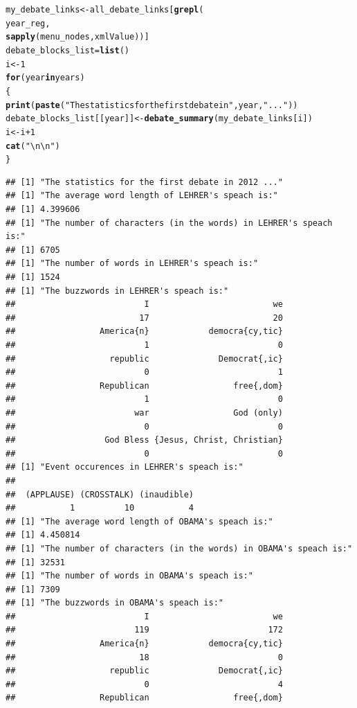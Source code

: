\documentclass{article}\usepackage[]{graphicx}\usepackage[]{color}
\makeatletter
\newcommand{\hlnum}[1]{\textcolor[rgb]{0.686,0.059,0.569}{#1}}%
\newcommand{\hlstr}[1]{\textcolor[rgb]{0.192,0.494,0.8}{#1}}%
\newcommand{\hlopt}[1]{\textcolor[rgb]{0,0,0}{#1}}%
\newcommand{\hlstd}[1]{\textcolor[rgb]{0.345,0.345,0.345}{#1}}%
\newcommand{\hlkwa}[1]{\textcolor[rgb]{0.161,0.373,0.58}{\textbf{#1}}}%
\newcommand{\hlkwb}[1]{\textcolor[rgb]{0.69,0.353,0.396}{#1}}%
\newcommand{\hlkwd}[1]{\textcolor[rgb]{0.737,0.353,0.396}{\textbf{#1}}}%
\newenvironment{kframe}{%
 \def\at@end@of@kframe{}%
 \ifinner\ifhmode%
  \def\at@end@of@kframe{\end{minipage}}%
  \begin{minipage}{\columnwidth}%
 \fi\fi%
 \def\FrameCommand##1{\hskip\@totalleftmargin \hskip-\fboxsep
 \colorbox{shadecolor}{##1}\hskip-\fboxsep
     \hskip-\linewidth \hskip-\@totalleftmargin \hskip\columnwidth}%
 \MakeFramed {\advance\hsize-\width
   \@totalleftmargin\z@ \linewidth\hsize
   \@setminipage}}%
 {\par\unskip\endMakeFramed%
 \at@end@of@kframe}
\newenvironment{knitrout}{}{} %
\makeatother
\begin{document}
\begin{knitrout}
\begin{kframe}
\begin{alltt}
\hlstd{my_debate_links} \hlkwb{<-} \hlstd{all_debate_links[}\hlkwd{grepl}\hlstd{(}
  \hlstd{year_reg,}
  \hlkwd{sapply}\hlstd{(menu_nodes,xmlValue))]}
\hlstd{debate_blocks_list} \hlkwb{=} \hlkwd{list}\hlstd{()}
\hlstd{i} \hlkwb{<-} \hlnum{1}
\hlkwa{for} \hlstd{(year} \hlkwa{in} \hlstd{years)}
\hlstd{\{}
  \hlkwd{print}\hlstd{(}\hlkwd{paste}\hlstd{(}\hlstr{"The statistics for the first debate in"}\hlstd{,year,}\hlstr{"..."}\hlstd{))}
  \hlstd{debate_blocks_list[[year]]} \hlkwb{<-} \hlkwd{debate_summary}\hlstd{(my_debate_links[i])}
  \hlstd{i} \hlkwb{<-} \hlstd{i} \hlopt{+} \hlnum{1}
  \hlkwd{cat}\hlstd{(}\hlstr{"\textbackslash{}n\textbackslash{}n"}\hlstd{)}
\hlstd{\}}
\end{alltt}
\begin{verbatim}
## [1] "The statistics for the first debate in 2012 ..."
## [1] "The average word length of LEHRER's speach is:"
## [1] 4.399606
## [1] "The number of characters (in the words) in LEHRER's speach is:"
## [1] 6705
## [1] "The number of words in LEHRER's speach is:"
## [1] 1524
## [1] "The buzzwords in LEHRER's speach is:"
##                          I                         we 
##                         17                         20 
##                 America{n}            democra{cy,tic} 
##                          1                          0 
##                   republic              Democrat{,ic} 
##                          0                          1 
##                 Republican                 free{,dom} 
##                          1                          0 
##                        war                 God (only) 
##                          0                          0 
##                  God Bless {Jesus, Christ, Christian} 
##                          0                          0 
## [1] "Event occurences in LEHRER's speach is:"
## 
##  (APPLAUSE) (CROSSTALK) (inaudible) 
##           1          10           4 
## [1] "The average word length of OBAMA's speach is:"
## [1] 4.450814
## [1] "The number of characters (in the words) in OBAMA's speach is:"
## [1] 32531
## [1] "The number of words in OBAMA's speach is:"
## [1] 7309
## [1] "The buzzwords in OBAMA's speach is:"
##                          I                         we 
##                        119                        172 
##                 America{n}            democra{cy,tic} 
##                         18                          0 
##                   republic              Democrat{,ic} 
##                          0                          4 
##                 Republican                 free{,dom} 

\end{verbatim}
\end{kframe}
\end{knitrout}
\end{document}
